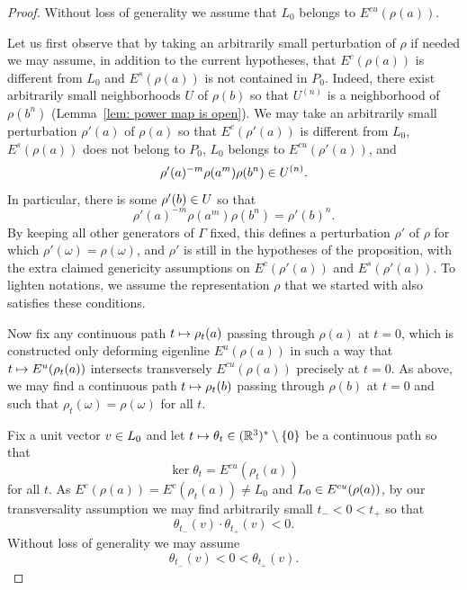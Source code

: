 \documentclass[10pt,a4paper]{amsart}
\newcommand{\R}{\mathbb{R}}
\newcommand{\RR}{\R}
\newcommand{\Es}{E^s}
\newcommand{\Ec}{E^c}
\newcommand{\Eu}{E^u}
\newcommand{\Ecu}{E^{cu}}
\let\oldmapsto\mapsto
\renewcommand*{\mapsto}{\mathchoice{\longmapsto}{\oldmapsto}{\oldmapsto}{\oldmapsto}}
\let\oldin\in
\renewcommand{\in}{\mathchoice{\oldin}{\oldin}{\,\oldin\,}{\,\oldin\,}}
\numberwithin{equation}{section}
\theoremstyle{definition}\newtheorem{defi}[theo]{Definition}
\begin{document}
\begin{proof}
Without loss of generality we assume that $L_0$ belongs to $\Ecu(\rho(a))$.


Let us first observe that by taking an arbitrarily small perturbation of $\rho$ if needed we may assume, in addition to the current hypotheses, that $\Ec(\rho(a))$ is different from $L_0$ and $\Es(\rho(a))$ is not contained in $P_0$. Indeed, there exist arbitrarily small neighborhoods $U$ of $\rho(b)$ so that $U^{(n)}$ is a neighborhood of $\rho(b^{n})$ (Lemma~\ref{lem: power map is open}).
We may take an arbitrarily small perturbation $\rho'(a)$ of $\rho(a)$ so that $\Ec(\rho'(a))$ is different from $L_0$, $\Es(\rho(a))$ does not belong to $P_0$, $L_0$ belongs to $\Ecu(\rho'(a))$, and
\[
\rho'(a)^{-m}\rho(a^{m})\rho(b^{n}) \in U^{(n)}.
\]
In particular, there is some $\rho'(b)\in U$ so that
\[
\rho'(a)^{-m}\rho(a^{m})\rho(b^{n})=\rho'(b)^{n}.
\]
By keeping all other generators of $\Gamma$ fixed, this defines a perturbation $\rho'$ of $\rho$ for which $\rho'(\omega)=\rho(\omega)$, and $\rho'$ is still in the hypotheses of the proposition, with the extra claimed genericity assumptions on $\Ec(\rho'(a))$ and $\Es(\rho'(a))$. To lighten notations, we assume the representation $\rho$ that we started with also satisfies these conditions.



Now fix any continuous path $t\mapsto\rho_t(a)$ passing through $\rho(a)$ at $t=0$, which is constructed only deforming eigenline $\Eu(\rho(a))$ in such a way that $t\mapsto \Eu(\rho_t(a))$ intersects transversely $\Ecu(\rho(a))$ precisely at $t=0$. As above, we may find a continuous path $t\mapsto \rho_t(b)$ passing through $\rho(b)$ at $t=0$ and such that $\rho_t(\omega)=\rho(\omega)$ for all $t$.



Fix a unit vector $v\in L_0$ and let $t\mapsto \theta_t\in(\RR^3)^*\setminus\{0\}$ be a continuous path so that
\[
\ker\theta_t=\Ecu(\rho_t(a))
\]
for all $t$.
As $\Ec(\rho(a))=\Ec(\rho_t(a))\neq L_0$ and $L_0\in\Ecu(\rho(a))$, by our transversality assumption we may find arbitrarily small $t_-<0<t_+$ so that
\[
\theta_{t_-}(v)\cdot \theta_{t_+}(v)<0.
\]
Without loss of generality we may assume
\begin{equation}\label{eq: criterion for non robust qi}
\theta_{t_-}(v)<0<\theta_{t_+}(v).
\end{equation}



\end{proof}
\end{document}
